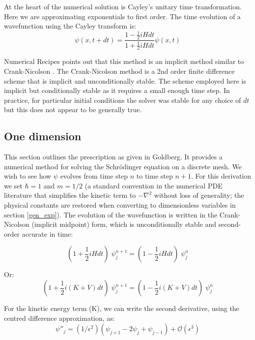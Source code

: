 At the heart of the numerical solution is Cayley's unitary time transformation. Here we are approximating exponentials to first order. The time evolution of a wavefunction using the Cayley transform is:
\begin{equation}
\label{cayley_eqn}
\psi(x, t+dt) = \frac{1- \frac{1}{2} i H dt}{1+ \frac{1}{2} i H dt} \psi(x, t)
\end{equation}

\noindent Numerical Recipes points out that this method is an implicit method similar to Crank-Nicolson \citep{bib_cn}. The Crank-Nicolson method is a 2nd order finite difference scheme that is implicit and unconditionally stable. The scheme employed here is implicit but conditionally stable as it requires a small enough time step. In practice, for particular initial conditions the solver was stable for any choice of $dt$ but this does not appear to be generally true.

\subsection{One dimension}
\label{onedim}
This section outlines the prescription as given in Goldberg. It provides a numerical method for solving the Schr\"odinger equation on a discrete mesh. We wish to see how $\psi$ evolves from time step $n$ to time step $n+1$. For this derivation we set $\hbar = 1$ and $m = 1/2$ (a standard convention in the numerical PDE literature that simplifies the kinetic term to $-\nabla^2$ without loss of generality; the physical constants are restored when converting to dimensionless variables in section \ref{gen_exp}). The evolution of the wavefunction is written in the Crank-Nicolson (implicit midpoint) form, which is unconditionally stable and second-order accurate in time:

\begin{equation}
(1+ \frac{1}{2} i H dt) \;\psi_{j}^{n+1} =  (1- \frac{1}{2} i H dt) \; \psi_{j}^n
\end{equation}

\noindent Or: 
\begin{equation}
\label{cayley_kv}
(1+ \frac{1}{2} i (K+V) dt) \;\psi_{j}^{n+1} =  (1- \frac{1}{2} i (K+V) dt) \; \psi_{j}^n
\end{equation}

\noindent For the kinetic energy term (K), we can write the second derivative, using the centred difference approximation, as:
\begin{equation}
\psi''_{j} = (1/\epsilon^2)(\psi_{j+1} - 2\psi_j + \psi_{j-1}) + \mathcal{O} (\epsilon^3)
\end{equation}

